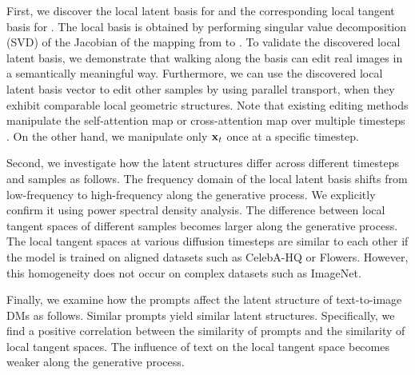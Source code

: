 First, we discover the local latent basis for \exspace{} and the corresponding local tangent basis for \ehspace{}.
The local basis is obtained by performing singular value decomposition (SVD) of the Jacobian of the mapping from \exspace{} to \ehspace{}.
To validate the discovered local latent basis, we demonstrate that 
walking along the basis
can edit real images in a semantically meaningful way. 
Furthermore, we can use the discovered local latent basis vector to edit other samples by using parallel transport, when they exhibit comparable local geometric structures.
Note that existing editing methods manipulate the self-attention map or cross-attention map over multiple timesteps \cite{hertz2022prompt, tumanyan2022plug, parmar2023zero}. On the other hand, we manipulate only $\mathbf{x}_t$ once at a specific timestep.

Second, we investigate how the latent structures differ across different timesteps and samples as follows.
The frequency domain of the local latent basis shifts from low-frequency to high-frequency along the generative process. 
We explicitly confirm it using power spectral density analysis.
The difference between local tangent spaces of different samples becomes larger along the generative process. 
The local tangent spaces at various diffusion timesteps are similar to each other if the model is trained on aligned datasets such as CelebA-HQ or Flowers. However, this homogeneity does not occur on complex datasets such as ImageNet.


Finally, we examine how the prompts affect the latent structure of text-to-image DMs as follows.
Similar prompts yield similar latent structures. Specifically, we find a positive correlation between the similarity of prompts and the similarity of local tangent spaces.
The influence of text on the local tangent space becomes weaker along the generative process. %

